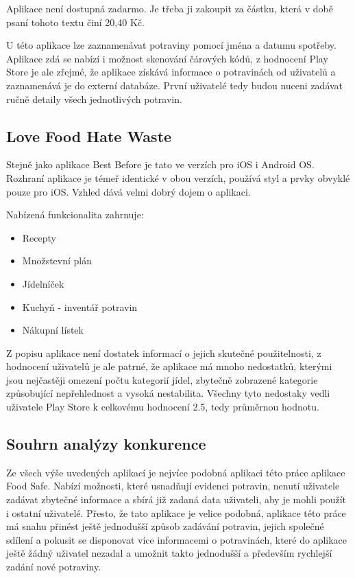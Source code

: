 \documentclass[thesis=B,czech]{FITthesis}[2013/10/20]
\begin{document}
Aplikace není dostupná zadarmo. Je třeba ji zakoupit za částku, která v době psaní tohoto textu činí 20,40 Kč.

U této aplikace lze zaznamenávat potraviny pomocí jména a datumu spotřeby. Aplikace zdá se nabízí i možnost skenování čárových kódů, z hodnocení Play Store je ale zřejmé, že aplikace získává informace o potravinách od uživatelů a zaznamenává je do externí databáze. První uživatelé tedy budou nuceni zadávat ručně detaily všech jednotlivých potravin.

\subsection{Love Food Hate Waste}

Stejně jako aplikace Best Before je tato ve verzích pro iOS i Android OS. Rozhraní aplikace je témeř identické v obou verzích, používá styl a prvky obvyklé pouze pro iOS. Vzhled dává velmi dobrý dojem 
o aplikaci.

Nabízená funkcionalita zahrnuje:
\begin{itemize}
  \item{Recepty}
  \item{Množstevní plán}
  \item{Jídelníček}
  \item{Kuchyň - inventář potravin}
  \item{Nákupní lístek}
\end{itemize}

Z popisu aplikace není dostatek informací o jejich skutečné použitelnosti, z hodnocení uživatelů je ale patrné, že aplikace má mnoho nedostatků, kterými jsou nejčastěji omezení počtu kategorií jídel, zbytečně zobrazené kategorie způsobující nepřehlednost a vysoká nestabilita. Všechny tyto nedostaky vedli uživatele Play Store k celkovému hodnocení 2.5, tedy průměrnou hodnotu.

\subsection{Souhrn analýzy konkurence}

Ze všech výše uvedených aplikací je nejvíce podobná aplikaci této práce aplikace Food Safe. Nabízí možnosti, které usnadňují evidenci potravin, nenutí uživatele zadávat zbytečné informace a sbírá již zadaná data uživateli, aby je mohli použít i ostatní uživatelé. Přesto, že tato aplikace je velice podobná, aplikace této práce má snahu přinést ještě jednodušší způsob zadávání potravin, jejich společné sdílení a pokusit se disponovat více informacemi o potravinách, které do aplikace ještě žádný uživatel nezadal a umožnit takto jednodušší a především rychlejší zadání nové potraviny.
\end{document}
